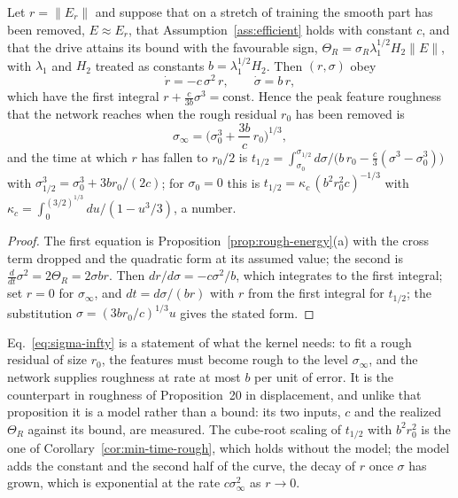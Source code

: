 \begin{proposition}
\label{prop:reduced}
Let $r=\|E_r\|$ and suppose that on a stretch of training the smooth part has
been removed, $E\approx E_r$, that Assumption~\ref{ass:efficient} holds with
constant $c$, and that the drive attains its bound with the favourable sign,
$\Theta_R=\sigma_R\lambda_1^{1/2}H_2\|E\|$, with $\lambda_1$ and $H_2$
treated as constants $b=\lambda_1^{1/2}H_2$. Then $(r,\sigma)$ obey
\begin{equation}
\dot r = -c\,\sigma^2\,r, \qquad \dot\sigma = b\,r ,
\label{eq:reduced-ode}
\end{equation}
which have the first integral $r+\frac{c}{3b}\sigma^3=\mathrm{const}$. Hence
the peak feature roughness that the network reaches when the rough residual
$r_0$ has been removed is
\begin{equation}
\sigma_\infty = \Big(\sigma_0^3+\frac{3b}{c}\,r_0\Big)^{1/3},
\label{eq:sigma-infty}
\end{equation}
and the time at which $r$ has fallen to $r_0/2$ is
$t_{1/2}=\int_{\sigma_0}^{\sigma_{1/2}}d\sigma\big/\big(b\,r_0-\tfrac{c}{3}(\sigma^3-\sigma_0^3)\big)$
with $\sigma_{1/2}^3=\sigma_0^3+3br_0/(2c)$; for $\sigma_0=0$ this is
$t_{1/2}=\kappa_c\,(b^2r_0^2c)^{-1/3}$ with
$\kappa_c=\int_0^{(3/2)^{1/3}}du/(1-u^3/3)$, a number.
\end{proposition}

\begin{proof}
The first equation is Proposition~\ref{prop:rough-energy}(a) with the cross
term dropped and the quadratic form at its assumed value; the second is
$\frac{d}{dt}\sigma^2=2\Theta_R=2\sigma b r$. Then
$dr/d\sigma=-c\sigma^2/b$, which integrates to the first integral; set $r=0$
for $\sigma_\infty$, and $dt=d\sigma/(br)$ with $r$ from the first integral
for $t_{1/2}$; the substitution $\sigma=(3br_0/c)^{1/3}u$ gives the stated form.
\end{proof}

Eq.~\eqref{eq:sigma-infty} is a statement of what the kernel needs: to fit a
rough residual of size $r_0$, the features must become rough to the level
$\sigma_\infty$, and the network supplies roughness at rate at most $b$ per
unit of error. It is the counterpart in roughness of Proposition~20 in
displacement, and unlike that proposition it is a model rather than a bound:
its two inputs, $c$ and the realized $\Theta_R$ against its bound, are
measured. The cube-root scaling of $t_{1/2}$ with $b^2r_0^2$ is the one of
Corollary~\ref{cor:min-time-rough}, which holds without the model; the model
adds the constant and the second half of the curve, the decay of $r$ once
$\sigma$ has grown, which is exponential at the rate $c\sigma_\infty^2$ as
$r\to0$.

